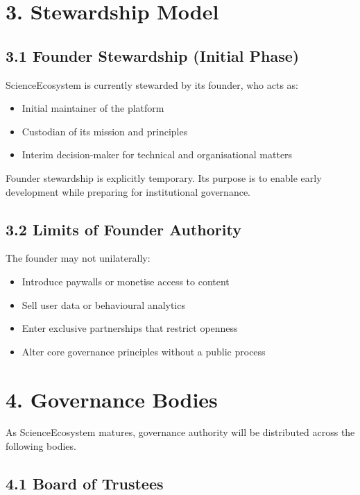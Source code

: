 \section*{3. Stewardship Model}

\subsection*{3.1 Founder Stewardship (Initial Phase)}

ScienceEcosystem is currently stewarded by its founder, who acts as:
\begin{itemize}
    \item Initial maintainer of the platform
    \item Custodian of its mission and principles
    \item Interim decision-maker for technical and organisational matters
\end{itemize}

Founder stewardship is explicitly temporary. Its purpose is to enable early development while preparing for institutional governance.

\subsection*{3.2 Limits of Founder Authority}

The founder may not unilaterally:
\begin{itemize}
    \item Introduce paywalls or monetise access to content
    \item Sell user data or behavioural analytics
    \item Enter exclusive partnerships that restrict openness
    \item Alter core governance principles without a public process
\end{itemize}

\section*{4. Governance Bodies}

As ScienceEcosystem matures, governance authority will be distributed across the following bodies.

\subsection*{4.1 Board of Trustees}

